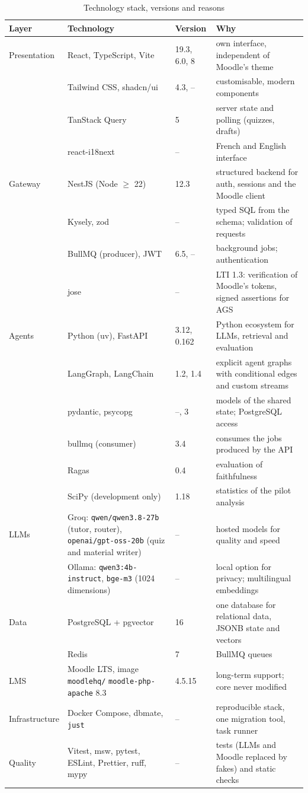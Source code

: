 \begin{table}[htbp]
\centering
\caption{Technology stack, versions and reasons}
\label{tab-stack}
\scriptsize
\begin{tabularx}{\textwidth}{@{}L{1.8cm}L{3.6cm}L{1.8cm}Y@{}}
\toprule
\textbf{Layer} & \textbf{Technology} & \textbf{Version} & \textbf{Why} \\
\midrule
Presentation & React, TypeScript, Vite & 19.3, 6.0, 8 & own interface, independent of Moodle's theme \\
 & Tailwind CSS, shadcn/ui & 4.3, -- & customisable, modern components \\
 & TanStack Query & 5 & server state and polling (quizzes, drafts) \\
 & react-i18next & -- & French and English interface \\
Gateway & NestJS (Node $\geq$ 22) & 12.3 & structured backend for auth, sessions and the Moodle client \\
 & Kysely, zod & -- & typed SQL from the schema; validation of requests \\
 & BullMQ (producer), JWT & 6.5, -- & background jobs; authentication \\
 & jose & -- & LTI 1.3: verification of Moodle's tokens, signed assertions for AGS \\
Agents & Python (uv), FastAPI & 3.12, 0.162 & Python ecosystem for LLMs, retrieval and evaluation \\
 & LangGraph, LangChain & 1.2, 1.4 & explicit agent graphs with conditional edges and custom streams \\
 & pydantic, psycopg & --, 3 & models of the shared state; PostgreSQL access \\
 & bullmq (consumer) & 3.4 & consumes the jobs produced by the API \\
 & Ragas & 0.4 & evaluation of faithfulness \\
 & SciPy (development only) & 1.18 & statistics of the pilot analysis \\
LLMs & Groq: \texttt{qwen/qwen3.8-27b} (tutor, router), \texttt{openai/gpt-oss-20b} (quiz and material writer) & -- & hosted models for quality and speed \\
 & Ollama: \texttt{qwen3:4b-instruct}, \texttt{bge-m3} (1024 dimensions) & -- & local option for privacy; multilingual embeddings \\
Data & PostgreSQL + pgvector & 16 & one database for relational data, JSONB state and vectors \\
 & Redis & 7 & BullMQ queues \\
LMS & Moodle LTS, image \texttt{moodlehq/} \texttt{moodle-php-apache} 8.3 & 4.5.15 & long-term support; core never modified \\
Infrastructure & Docker Compose, dbmate, \texttt{just} & -- & reproducible stack, one migration tool, task runner \\
Quality & Vitest, msw, pytest, ESLint, Prettier, ruff, mypy & -- & tests (LLMs and Moodle replaced by fakes) and static checks \\
\bottomrule
\end{tabularx}
\end{table}

